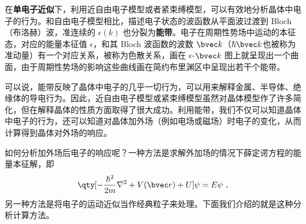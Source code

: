 
在\textbf{单电子近似}下，利用近自由电子模型或者紧束缚模型，可以有效地分析晶体中电子的行为。和自由电子模型相比，描述电子状态的波函数从平面波过渡到 Bloch （布洛赫）波，准连续的 $\epsilon(k)$ 也分裂为\textbf{能带}。电子在周期性势场中运动的本征态，对应的能量本征值 $\epsilon$，和其 Bloch 波函数的波数 $\bvec k$（$\hbar \bvec k$也被称为准动量）有一个对应关系，被称为色散关系，画在 $\epsilon$-${\bvec k}$ 图上就呈现出一个曲面，由于周期性势场的影响这些曲线画在简约布里渊区中呈现出若干个能带。

可以说，能带反映了晶体中电子的几乎一切行为，可以用来解释金属、半导体、绝缘体的导电行为。因此，近自由电子模型或紧束缚模型虽然对晶体模型作了许多简化，但在解释晶体的性质方面取得了很大成功。利用能带，我们不仅可以知道晶体中电子的行为，还可以知道对晶体加外场（例如电场或磁场）时电子的变化，从而计算得到晶体对外场的响应。

如何分析加外场后电子的响应呢？一种方法是求解外加场的情况下薛定谔方程的能量本征解，即
\begin{equation}
\qty[-\frac{\hbar^2}{2m}\nabla^2+V(\bvec r)+U]\psi = E\psi~,
\end{equation}
另一种方法是将电子的运动近似当作经典粒子来处理。下面我们介绍的就是这种分析计算方法。
